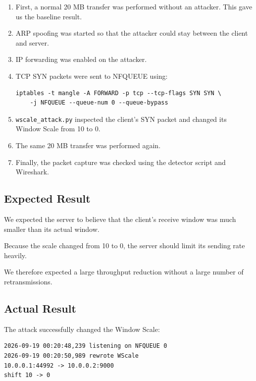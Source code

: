 \documentclass[11pt]{article}
\begin{document}
\begin{enumerate}
    \item First, a normal 20 MB transfer was performed without an attacker.
    This gave us the baseline result.

    \item ARP spoofing was started so that the attacker could stay
    between the client and server.

    \item IP forwarding was enabled on the attacker.

    \item TCP SYN packets were sent to NFQUEUE using:

\begin{lstlisting}
iptables -t mangle -A FORWARD -p tcp --tcp-flags SYN SYN \
    -j NFQUEUE --queue-num 0 --queue-bypass
\end{lstlisting}

    \item \texttt{wscale\_attack.py} inspected the client's SYN packet
    and changed its Window Scale from 10 to 0.

    \item The same 20 MB transfer was performed again.

    \item Finally, the packet capture was checked using the detector
    script and Wireshark.
\end{enumerate}

\subsection{Expected Result}

We expected the server to believe that the client's receive window
was much smaller than its actual window.

Because the scale changed from 10 to 0, the server should limit its
sending rate heavily.

We therefore expected a large throughput reduction without a large
number of retransmissions.

\subsection{Actual Result}

The attack successfully changed the Window Scale:

\begin{lstlisting}
2026-09-19 00:20:48,239 listening on NFQUEUE 0
2026-09-19 00:20:50,989 rewrote WScale
10.0.0.1:44992 -> 10.0.0.2:9000
shift 10 -> 0
\end{lstlisting}
\end{document}
